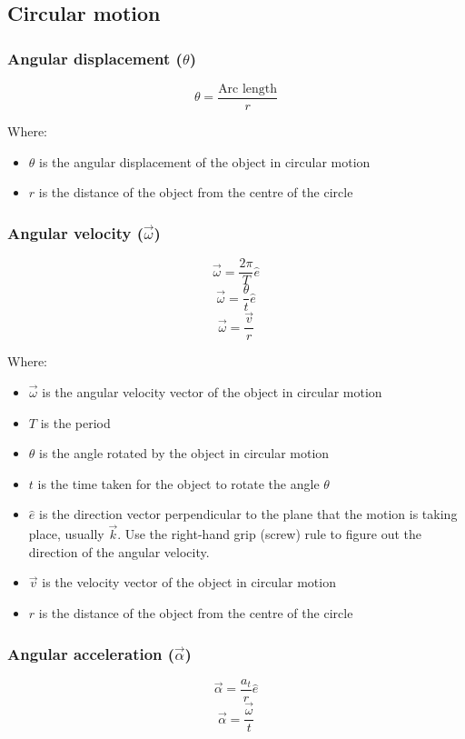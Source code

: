 \documentclass[11pt]{article}
\begin{document}
 \newpage

\subsection{Circular motion}
\label{sec:org7068071}

\subsubsection{Angular displacement (\(\theta\))}
\label{sec:orgd750d97}
\[\theta = \frac{\text{Arc length}}{r}\]

Where:
\begin{itemize}
\item \(\theta\) is the angular displacement of the object in circular motion
\item \(r\) is the distance of the object from the centre of the circle
\end{itemize}

\subsubsection{Angular velocity (\(\vec{\omega}\))}
\label{sec:org31a36ac}
\[\vec{\omega} = \frac{2 \pi}{T} \hat{e}\]
\[\vec{\omega} = \frac{\theta}{t} \hat{e}\]
\[\vec{\omega} = \frac{\vec{v}}{r}\]

Where:
\begin{itemize}
\item \(\vec{\omega}\) is the angular velocity vector of the object in circular motion
\item \(T\) is the period
\item \(\theta\) is the angle rotated by the object in circular motion
\item \(t\) is the time taken for the object to rotate the angle \(\theta\)
\item \(\hat{e}\) is the direction vector perpendicular to the plane that the motion is taking place, usually \(\vec{k}\). Use the right-hand grip (screw) rule to figure out the direction of the angular velocity.
\item \(\vec{v}\) is the velocity vector of the object in circular motion
\item \(r\) is the distance of the object from the centre of the circle
\end{itemize}

 \newpage

\subsubsection{Angular acceleration (\(\vec{\alpha}\))}
\label{sec:orgcc6dfe0}
\[\vec{\alpha} = \frac{a_t}{r} \hat{e}\]
\[\vec{\alpha} = \frac{\vec{\omega}}{t}\]
\end{document}
